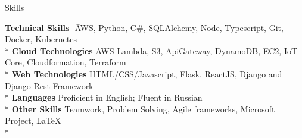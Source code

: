 \documentclass[a4paper]{article}
\newlength{\tabin}
\newlength{\secsep}
\newcommand{\lineunder}{\vspace*{-8pt}\\\hspace*{-6pt}\hrulefill\\\vspace*{-15pt}}
\newenvironment{tabbedsection}[1]{
  \begin{list}{}{
    \setlength{\itemsep}{0pt}
    \setlength{\labelsep}{0pt}
    \setlength{\labelwidth}{0pt}
    \setlength{\leftmargin}{\tabin}
    \setlength{\rightmargin}{\tabin}
    \setlength{\listparindent}{0pt}
    \setlength{\parsep}{0pt}
    \setlength{\parskip}{0pt}
    \setlength{\partopsep}{0pt}
    \setlength{\topsep}{#1}
  }
  \item[]
}{\end{list}}
\newenvironment{nospacetabbing}{\begin{tabbing}}{\end{tabbing}\vspace{-1.2em}}
\newenvironment{resume_section}[1]{
  \filbreak
  \vspace{2\secsep}
  \textsc{\large#1}
  \lineunder
  \begin{tabbedsection}{\secsep}
}{\end{tabbedsection}}
\newenvironment{resume_subsection}[2]{
  \vspace{\secsep}
  \textbf{#1 \hfill #2} \\ \vspace{-10pt}
  \begin{tabbedsection}{0.5\secsep}
}{\end{tabbedsection}}
\newenvironment{subitems}{
  \renewcommand{\labelitemi}{-}
  \begin{itemize}
  \setlength{\labelsep}{1em}
}{\end{itemize}}
\begin{document}




\begin{resume_section}{Skills}
  \begin{nospacetabbing}
    \textbf{Technical Skills} \= \hspace{2em} \= AWS, Python, C\#, SQLAlchemy, Node, Typescript, Git, Docker, Kubernetes\\*
    \textbf{Cloud Technologies} \> \> AWS Lambda, S3, ApiGateway, DynamoDB, EC2, IoT Core, Cloudformation, Terraform\\*
    \textbf{Web Technologies} \> \> HTML/CSS/Javascript, Flask, ReactJS, Django and Django Rest Framework\\*
    \textbf{Languages} \> \> Proficient in English; Fluent in Russian\\*
    \textbf{Other Skills} \> \> Teamwork, Problem Solving, Agile frameworks, Microsoft Project, \LaTeX\\*
  \end{nospacetabbing}
\end{resume_section}
\end{document}
